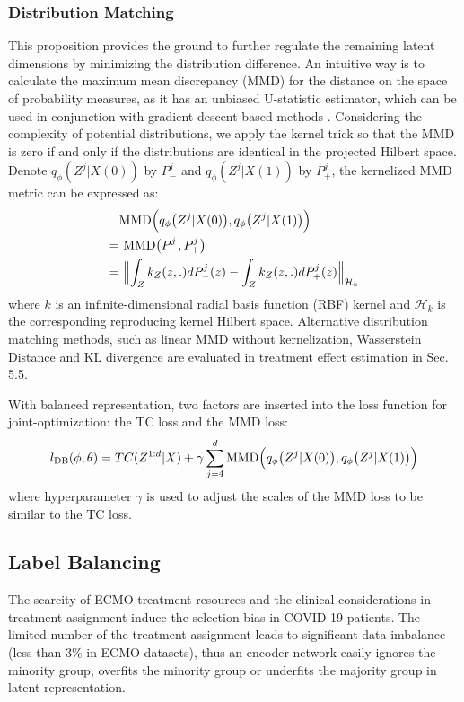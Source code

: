 \subsubsection{Distribution Matching}
This proposition provides the ground to further regulate the remaining latent dimensions by minimizing the distribution difference.  
An intuitive way is to calculate the maximum mean discrepancy (MMD) for the distance on the space of probability measures, as it has an unbiased U-statistic estimator, which can be used
in conjunction with gradient descent-based methods \cite{tolstikhin2017wasserstein,tolstikhin2016mmd}.  Considering the complexity of potential distributions, we apply the kernel trick so that the MMD is zero if and only if the distributions are identical in the projected Hilbert space. Denote $q_{\phi}(Z^j|X(0))$ by $P^j_{-}$ and $q_{\phi}(Z^j|X(1))$ by $P^j_{+}$, the kernelized MMD metric can be expressed as:
\begin{equation}
    \begin{split}
    &\text{MMD}\Bigl(q_{\phi}\bigl(Z^j|X(0)\bigr),q_{\phi}\bigl(Z^j|X(1)\bigr)\Bigr) \\
    =& \ 
    \text{MMD}\bigl(P^j_{-},P^j_{+}\bigr)\\
    =& \ 
    \Bigl\|
    \int_Z k_Z(z,.)dP^j_{-}(z)  -
    \int_Z k_Z(z,.)dP^j_{+}(z)
    \Bigr\|_{\mathcal{H}_k}
    \end{split}
\end{equation}
where $k$ is an infinite-dimensional radial basis function (RBF) kernel and $\mathcal{H}_k$ is the corresponding reproducing kernel Hilbert space. Alternative distribution matching methods, such as linear MMD without kernelization, Wasserstein Distance and KL divergence are evaluated in treatment effect estimation in Sec. 5.5.

With balanced representation, two factors are inserted into the loss function for joint-optimization: the TC loss and the MMD loss:
\begin{equation}
    \begin{split}
    l_{\text{DB}}(\phi,\theta) = TC(Z^{1:d}|X) 
    + \gamma\sum_{j=4}^{d}\text{MMD}\Bigl(q_{\phi}\bigl(Z^j|X(0)\bigr),q_{\phi}\bigl(Z^j|X(1)\bigr)\Bigr)
    \end{split}
\end{equation}
where hyperparameter $\gamma$ is used to adjust the scales of the MMD loss to be similar to the TC loss.

\subsection{Label Balancing}
\label{sec:LB}
The scarcity of ECMO treatment resources and the clinical considerations in treatment assignment induce the selection bias in COVID-19 patients. The limited number of the treatment assignment leads to significant data imbalance (less than 3\% in ECMO datasets), thus an encoder network easily ignores the minority group, overfits the minority group or underfits the majority group in latent representation. 

